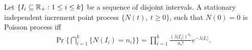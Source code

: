 \documentclass[a4paper,10pt,english]{article}
\begin{document}
\begin{prop}[Characterization 2] Let $\{I_i \subseteq \mathbb{R}_+: 1 \leq i \leq k\}$ be a sequence of disjoint intervals. A stationary independent increment point process $\{N(t),~t\geqslant 0\}$, such that $N(0) = 0$ is Poisson process iff 
\begin{align*}
  \Pr\{\bigcap_{i=1}^k \{N(I_i)= n_{i}\}\} = \prod_{i=1}^{k}\frac{(\lambda|I_i|)^{n_{i}}}{n_{i}!} e^{-\lambda |I_i|}.
\end{align*}
\end{prop}
\end{document}

